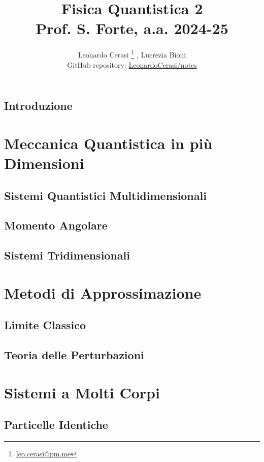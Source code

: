 \documentclass[a4paper, 12pt, openany]{book}
\author{Leonardo Cerasi%
	\thanks{\scriptsize\href{mailto:leonardo.cerasi@studenti.unimi.it}{leo.cerasi@pm.me}}%
	, Lucrezia Bioni\\
	\small GitHub repository: \href{https://github.com/LeonardoCerasi/notes}{LeonardoCerasi/notes}}
\title{\Huge\textbf{Fisica Quantistica 2} \\ \large Prof. S. Forte, a.a. 2024-25}
\begin{document}
\frontmatter

\maketitle

\tableofcontents
\pagestyle{indice}

\mainmatter

\chapter*{Introduzione}
\pagestyle{introd}


\part{Meccanica Quantistica in più Dimensioni}
\pagestyle{body}

\chapter{Sistemi Quantistici Multidimensionali}


\chapter{Momento Angolare}


\chapter{Sistemi Tridimensionali}


\part{Metodi di Approssimazione}
\pagestyle{body}

\chapter{Limite Classico}


\chapter{Teoria delle Perturbazioni}


\part{Sistemi a Molti Corpi}
\pagestyle{body}

\chapter{Particelle Identiche}

\end{document}
